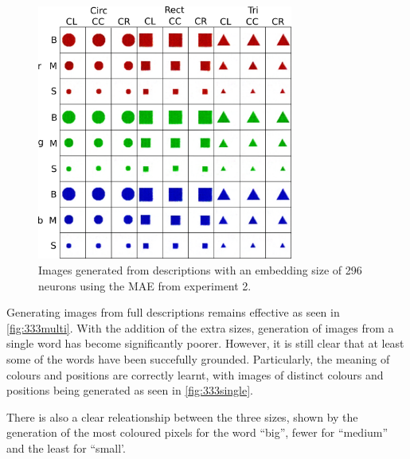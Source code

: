 \begin{figure}[h]
\centering
\includegraphics[width=0.75\textwidth]{Figs/shapes/multiword333.png}
\caption{Images generated from descriptions with an embedding size of 296 neurons using the MAE from experiment 2.}
\label{fig:333multi}
\end{figure}

Generating images from full descriptions remains effective as seen in \autoref{fig:333multi}.
With the addition of the extra sizes, generation of images from a single word has become significantly poorer. However, it is still clear that at least some of the words have been succefully grounded. Particularly, the meaning of colours and positions are correctly learnt, with images of distinct colours and positions being generated as seen in \autoref{fig:333single}. 

There is also a clear releationship between the three sizes, shown by the generation of the most coloured pixels for the word ``big'', fewer for ``medium'' and the least for ``small'.

